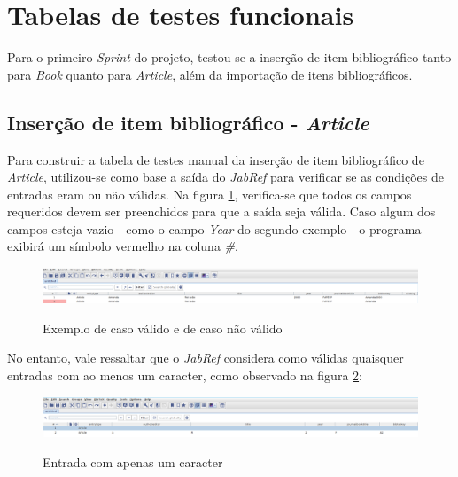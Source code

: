 \section{Tabelas de testes funcionais}
Para o primeiro \textit{Sprint} do projeto, testou-se a inserção de item bibliográfico tanto para \textit{Book} quanto para \textit{Article}, além da importação de itens bibliográficos.
    
    \subsection{Inserção de item bibliográfico - \textit{Article}}
        Para construir a tabela de testes manual da inserção de item bibliográfico de \textit{Article}, utilizou-se como base a saída do \textit{JabRef} para verificar se as condições de entradas eram ou não válidas. Na figura \ref{figura:base_testes_article}, verifica-se que todos os campos requeridos devem ser preenchidos para que a saída seja válida. Caso algum dos campos esteja vazio - como o campo \textit{Year} do segundo exemplo - o programa exibirá um símbolo vermelho na coluna \textit{\#}.
 
    \begin{figure}[H]
        \caption{Exemplo de caso válido e de caso não válido}
        \vspace{0.5cm}
        \centering
        \includegraphics[width=15cm]{images/base_testes_article.png}
        \label{figura:base_testes_article}
    \end{figure}
        
        No entanto, vale ressaltar que o \textit{JabRef} considera como válidas quaisquer entradas com ao menos um caracter, como observado na figura \ref{figura:base_testes_article_caracter}:

    \begin{figure}[H]
        \caption{Entrada com apenas um caracter}
        \vspace{0.5cm}
        \centering
        \includegraphics[width=15cm]{images/base_testes_article_caracter.png}
        \label{figura:base_testes_article_caracter}
    \end{figure}

